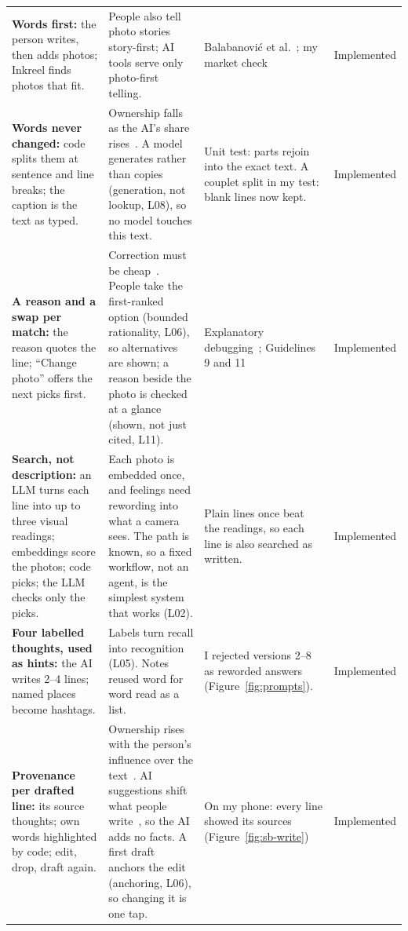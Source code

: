 \documentclass[11pt,a4paper]{article}
\begin{document}
{\begin{xltabular}{\textwidth}{@{}L{3.4cm}YL{2.95cm}L{1.75cm}@{}}
\textbf{Words first:} the person writes, then adds photos; Inkreel finds photos that fit.
& People also tell photo stories story-first; AI tools serve only photo-first telling.
& Balabanović et al.~\cite{balabanovic_storytelling_2000}; my market check
& Implemented\\
\textbf{Words never changed:} code splits them at sentence and line breaks; the caption is the
text as typed.
& Ownership falls as the AI's share rises~\cite{draxler_ai_2024}. A model generates rather than
copies (generation, not lookup, L08), so no model touches this text.
& Unit test: parts rejoin into the exact text. A couplet split in my test: blank lines now
kept.
& Implemented\\
\textbf{A reason and a swap per match:} the reason quotes the line; ``Change photo'' offers the
next picks first.
& Correction must be cheap~\cite{horvitz_principles_1999}. People take the first-ranked
option (bounded rationality, L06), so alternatives are shown; a reason beside the photo is
checked at a glance (shown, not just cited, L11).
& Explanatory debugging~\cite{kulesza_principles_2015}; Guidelines 9 and
11~\cite{amershi_guidelines_2019}
& Implemented\\
\textbf{Search, not description:} an LLM turns each line into up to three visual readings;
embeddings score the photos; code picks; the LLM checks only the picks.
& Each photo is embedded once, and feelings need rewording into what a camera sees. The path is
known, so a fixed workflow, not an agent, is the simplest system that works (L02).
& Plain lines once beat the readings, so each line is also searched as written.
& Implemented\\
\textbf{Four labelled thoughts, used as hints:} the AI writes 2--4 lines; named places become
hashtags.
& Labels turn recall into recognition (L05). Notes reused word
for word read as a list.
& I rejected versions 2--8 as reworded answers (Figure~\ref{fig:prompts}).
& Implemented\\
\textbf{Provenance per drafted line:} its source thoughts; own words highlighted by code; edit,
drop, draft again.
& Ownership rises with the person's influence over the text~\cite{draxler_ai_2024}. AI
suggestions shift what people
write~\cite{jakesch_co-writing_2023}, so the AI adds no facts. A first draft anchors the edit
(anchoring, L06), so changing it is one tap.
& On my phone: every line showed its sources (Figure~\ref{fig:sb-write})
& Implemented\\

\end{xltabular}}
\end{document}
